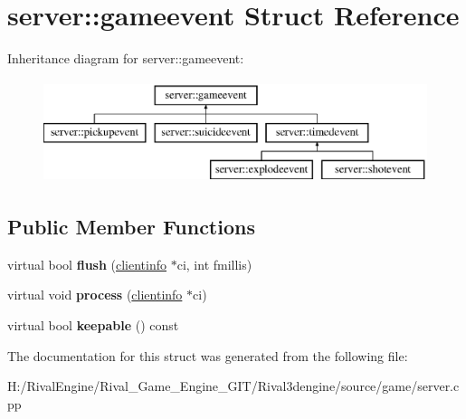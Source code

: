 \hypertarget{structserver_1_1gameevent}{}\section{server\+:\+:gameevent Struct Reference}
\label{structserver_1_1gameevent}
Inheritance diagram for server\+:\+:gameevent\+:\begin{figure}[H]
\begin{center}
\leavevmode
\includegraphics[height=3.000000cm]{structserver_1_1gameevent}
\end{center}
\end{figure}
\subsection*{Public Member Functions}
\begin{DoxyCompactItemize}
\item 
\mbox{\label{structserver_1_1gameevent_ac0a663a9bb2fdb51af36be3325338554}} 
virtual bool {\bfseries flush} (\hyperlink{structserver_1_1clientinfo}{clientinfo} $\ast$ci, int fmillis)
\item 
\mbox{\label{structserver_1_1gameevent_afa56069ed44707cd379e3680ddb55666}} 
virtual void {\bfseries process} (\hyperlink{structserver_1_1clientinfo}{clientinfo} $\ast$ci)
\item 
\mbox{\label{structserver_1_1gameevent_a488316582bf627973ef7bfe72a17752c}} 
virtual bool {\bfseries keepable} () const
\end{DoxyCompactItemize}


The documentation for this struct was generated from the following file\+:\begin{DoxyCompactItemize}
\item 
H\+:/\+Rival\+Engine/\+Rival\+\_\+\+Game\+\_\+\+Engine\+\_\+\+G\+I\+T/\+Rival3dengine/source/game/server.\+cpp\end{DoxyCompactItemize}
